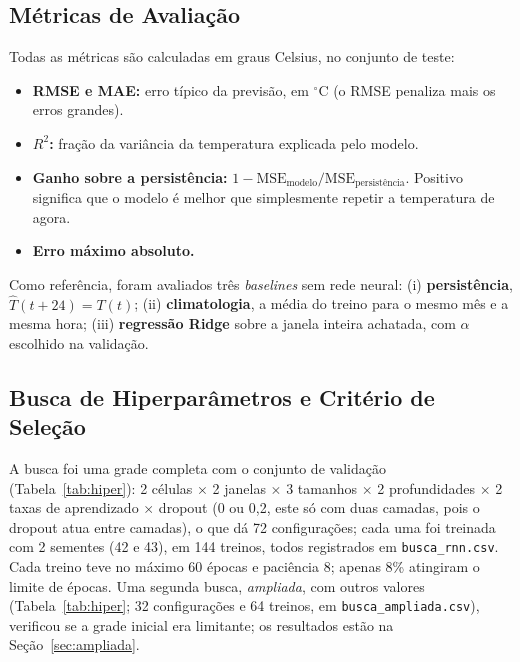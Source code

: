 \documentclass[11pt,a4paper]{article}
\begin{document}
\subsection{Métricas de Avaliação}
Todas as métricas são calculadas em graus Celsius, no conjunto de teste:
\begin{itemize}
    \item \textbf{RMSE e MAE:} erro típico da previsão, em $^\circ$C (o RMSE penaliza mais os erros grandes).
    \item \textbf{$R^2$:} fração da variância da temperatura explicada pelo modelo.
    \item \textbf{Ganho sobre a persistência:} $1-\mathrm{MSE}_{\text{modelo}}/\mathrm{MSE}_{\text{persistência}}$. Positivo significa que o modelo é melhor que simplesmente repetir a temperatura de agora.
    \item \textbf{Erro máximo absoluto.}
\end{itemize}

Como referência, foram avaliados três \emph{baselines} sem rede neural: (i) \textbf{persistência}, $\hat T(t+24)=T(t)$; (ii) \textbf{climatologia}, a média do treino para o mesmo mês e a mesma hora; (iii) \textbf{regressão Ridge} sobre a janela inteira achatada, com $\alpha$ escolhido na validação.

\subsection{Busca de Hiperparâmetros e Critério de Seleção}
A busca foi uma grade completa com o conjunto de validação (Tabela~\ref{tab:hiper}): 2 células $\times$ 2 janelas $\times$ 3 tamanhos $\times$ 2 profundidades $\times$ 2 taxas de aprendizado $\times$ dropout (0 ou 0,2, este só com duas camadas, pois o dropout atua entre camadas), o que dá 72 configurações; cada uma foi treinada com 2 sementes (42 e 43), em 144 treinos, todos registrados em \texttt{busca\_rnn.csv}. Cada treino teve no máximo 60 épocas e paciência 8; apenas 8\% atingiram o limite de épocas. Uma segunda busca, \emph{ampliada}, com outros valores (Tabela~\ref{tab:hiper}; 32 configurações e 64 treinos, em \texttt{busca\_ampliada.csv}), verificou se a grade inicial era limitante; os resultados estão na Seção~\ref{sec:ampliada}.
\end{document}
